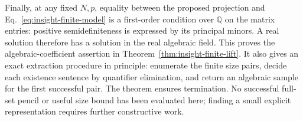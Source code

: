 Finally, at any fixed $N,p$, equality between the proposed projection
and Eq.~\eqref{eq:insight-finite-model} is a first-order condition
over $\mathbb Q$ on the matrix entries: positive semidefiniteness
is expressed by its principal minors. A real solution therefore
has a solution in the real algebraic field. This proves the
algebraic-coefficient assertion in
Theorem~\ref{thm:insight-finite-lift}. It also gives an exact
extraction procedure in principle: enumerate the finite size pairs,
decide each existence sentence by quantifier elimination, and
return an algebraic sample for the first successful pair.
The theorem ensures termination. No successful full-set pencil or
useful size bound has been evaluated here; finding a small explicit
representation requires further constructive work.
